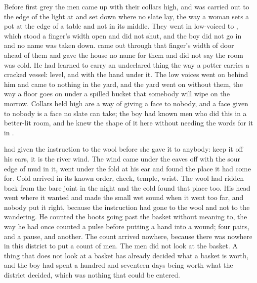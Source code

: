 
Before first grey the men came up  with their collars high, and  was carried out to the edge of the light at  and set down where no slate lay, the way a woman sets a pot at the edge of a table and not in its middle. They went in low-voiced to , which stood a finger's width open and did not shut, and the boy did not go in and no name was taken down.  came out through that finger's width of door ahead of them and gave the house no name for them and did not say the room was cold. He had learned to carry an undeclared thing the way a potter carries a cracked vessel: level, and with the hand under it. The low voices went on behind him and came to nothing in the yard, and the yard went on without them, the way a floor goes on under a spilled bucket that somebody will wipe on the morrow. Collars held high are a way of giving a face to nobody, and a face given to nobody is a face no slate can take; the boy had known men who did this in a better-lit room, and he knew the shape of it here without needing the words for it in .

 had given the instruction to the wool before she gave it to anybody: keep it off his ears, it is the river wind. The wind came under the eaves off  with the sour edge of mud in it, went under the fold at his ear and found the place it had come for. Cold arrived in its known order, cheek, temple, wrist. The wool had ridden back from the bare joint in the night and the cold found that place too. His head went where it wanted and made the small wet sound when it went too far, and nobody put it right, because the instruction had gone to the wool and not to the wandering. He counted the boots going past the basket without meaning to, the way he had once counted a pulse before putting a hand into a wound; four pairs, and a pause, and another. The count arrived nowhere, because there was nowhere in this district to put a count of men. The men did not look at the basket. A thing that does not look at a basket has already decided what a basket is worth, and the boy had spent a hundred and seventeen days being worth what the district decided, which was nothing that could be entered.


